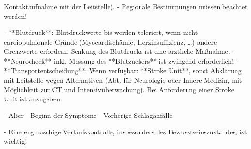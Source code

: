 \begin{itemize}
\begin{itemize}
\begin{enumerate}
      Kontaktaufnahme mit der Leitstelle).
      -   Regionale Bestimmungen müssen beachtet werden!
    \end{enumerate}
  \end{itemize}
  -    **Blutdruck**: Blutdruckwerte bis  werden toleriert,
  wenn nicht cardiopulmonale Gründe (Myocardischämie,
  Herzinsuffizienz, \ldots) andere Grenzwerte erfordern.
  Senkung des Blutdrucks ist eine ärztliche Maßnahme.
  -   **Neurocheck** inkl. Messung des **Blutzuckers** ist
  zwingend erforderlich!
  -   **Transportentscheidung**: Wenn verfügbar: **Stroke Unit**, sonst
  Abklärung mit Leitstelle wegen Alternativen (Abt. für
  Neurologie oder Innere Medizin, mit Möglichkeit zur CT und
  Intensivüberwachung).
  Bei Anforderung einer Stroke Unit ist anzugeben:
  \begin{enumerate}
    -   Alter
    -   Beginn der Symptome
    -   Vorherige Schlaganfälle
  \end{enumerate}
\end{itemize}

\begin{Danger}
  -   Eine engmaschige Verlaufskontrolle, insbesonders des
  Bewusstseinszustandes, ist wichtig!
\end{Danger}


\cite{Aass-1.0var1,AassMk-2013var1,MA70-Protokoll-2012-10-11,AsboeLvWien-2013-01-29,Lang2012,Ma70-Ausrueckordnung-2012-01-24}
